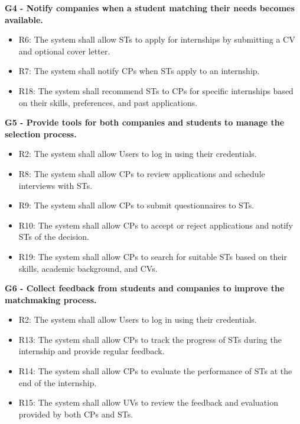 \vspace{1.5cm}
\textbf{G4 - Notify companies when a student matching their needs becomes available.}
\begin{itemize}
    \item R6: The system shall allow STs to apply for internships by submitting a CV and optional cover letter.
    \item R7: The system shall notify CPs when STs apply to an internship.
    \item R18: The system shall recommend STs to CPs for specific internships based on their skills, preferences, and past applications.
\end{itemize}

\vspace{1.5cm}
\textbf{G5 - Provide tools for both companies and students to manage the selection process.}
\begin{itemize}
    \item R2: The system shall allow Users to log in using their credentials.
    \item R8: The system shall allow CPs to review applications and schedule interviews with STs.
    \item R9: The system shall allow CPs to submit questionnaires to STs.
    \item R10: The system shall allow CPs to accept or reject applications and notify STs of the decision.
    \item R19: The system shall allow CPs to search for suitable STs based on their skills, academic background, and CVs.
\end{itemize}

\vspace{1.5cm}
\textbf{G6 - Collect feedback from students and companies to improve the matchmaking process.}
\begin{itemize}
    \item R2: The system shall allow Users to log in using their credentials.
    \item R13: The system shall allow CPs to track the progress of STs during the internship and provide regular feedback.
    \item R14: The system shall allow CPs to evaluate the performance of STs at the end of the internship.
    \item R15: The system shall allow UVs to review the feedback and evaluation provided by both CPs and STs.
\end{itemize}

